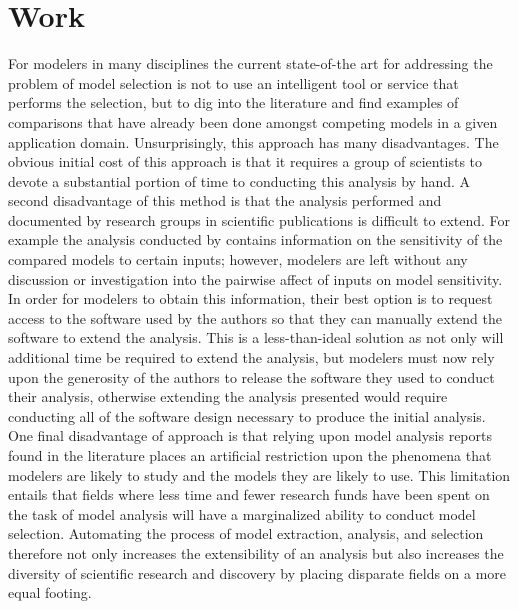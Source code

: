 \section{ Work\label{sec:prior_work}}  %
For modelers in many disciplines the current state-of-the art for addressing the problem of model selection is not to use an intelligent tool or service that performs the selection, but to dig into the literature and find examples of  comparisons that have already been done amongst competing models in a given application domain. Unsurprisingly, this approach has many disadvantages. The obvious initial cost of this approach is that it requires a group of scientists to devote a substantial portion of time to conducting this analysis by hand. A second disadvantage of this method is that the analysis performed and documented by research groups in scientific publications is difficult to extend. For example the analysis conducted by %
\cite{camargo2016six} contains information on the sensitivity of the compared models to certain inputs; however, modelers are left without any discussion or investigation into the pairwise affect of inputs on model sensitivity. In order for modelers to obtain this information, their best option is to request access to the software used by the authors so that they can manually extend the software to extend the analysis. This is a less-than-ideal solution as not only will additional time be required to extend the analysis, but modelers must now rely upon the generosity of the authors to release the software they used to conduct their analysis, otherwise extending the analysis presented would require conducting all of the software design necessary to produce the initial analysis. One final disadvantage of  %
approach is that relying upon model analysis reports found in the literature places an artificial restriction upon the phenomena that modelers are likely to study and the models they are likely to use. 
This limitation entails that fields where less time and fewer research funds have been spent on the task of model analysis will have a marginalized ability to conduct model selection. Automating the process of model extraction, analysis, and selection therefore not only increases the extensibility of an analysis but also increases the diversity of scientific research and discovery by placing disparate fields on a more equal footing.


